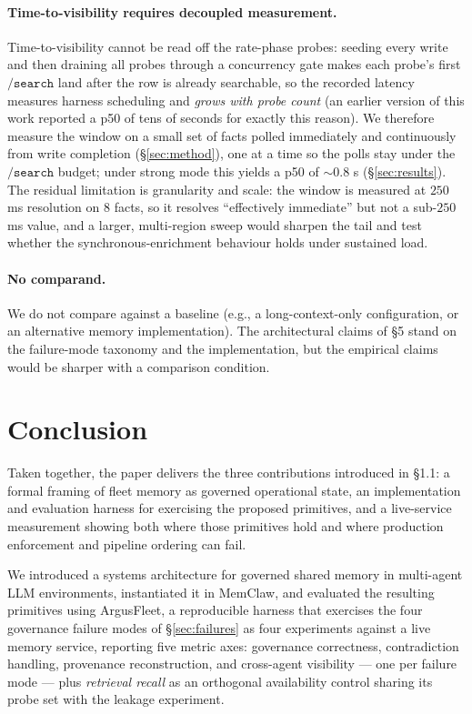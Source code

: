 \documentclass[10pt,twocolumn,letterpaper]{article}
\begin{document}
\paragraph{Time-to-visibility requires decoupled measurement.}
Time-to-visibility cannot be read off the rate-phase probes: seeding every write and then draining all probes through a concurrency gate makes each probe's first \(\mathtt{/search}\) land after the row is already searchable, so the recorded latency measures harness scheduling and \emph{grows with probe count} (an earlier version of this work reported a p50 of tens of seconds for exactly this reason). We therefore measure the window on a small set of facts polled immediately and continuously from write completion (\S\ref{sec:method}), one at a time so the polls stay under the \(\mathtt{/search}\) budget; under strong mode this yields a p50 of \(\sim\!0.8\) s (\S\ref{sec:results}). The residual limitation is granularity and scale: the window is measured at \(250\) ms resolution on \(8\) facts, so it resolves ``effectively immediate'' but not a sub-\(250\) ms value, and a larger, multi-region sweep would sharpen the tail and test whether the synchronous-enrichment behaviour holds under sustained load.

\paragraph{No comparand.}
We do not compare against a baseline (e.g., a long-context-only configuration, or an alternative memory implementation). The architectural claims of \S5 stand on the failure-mode taxonomy and the implementation, but the empirical claims would be sharper with a comparison condition.

\section{Conclusion}

Taken together, the paper delivers the three contributions introduced in \S1.1: a formal framing of fleet memory as governed operational state, an implementation and evaluation harness for exercising the proposed primitives, and a live-service measurement showing both where those primitives hold and where production enforcement and pipeline ordering can fail.

We introduced a systems architecture for governed shared memory in multi-agent LLM environments, instantiated it in MemClaw, and evaluated the resulting primitives using ArgusFleet, a reproducible harness that exercises the four governance failure modes of \S\ref{sec:failures} as four experiments against a live memory service, reporting five metric axes: governance correctness, contradiction handling, provenance reconstruction, and cross-agent visibility --- one per failure mode --- plus \emph{retrieval recall} as an orthogonal availability control sharing its probe set with the leakage experiment.
\end{document}
